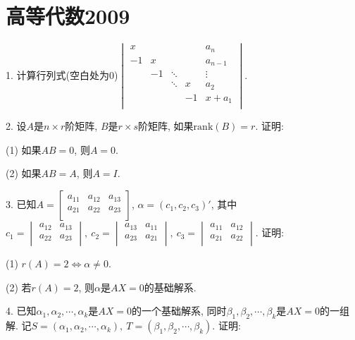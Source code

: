 \documentclass[12pt, a4paper, twoside]{ctexart}%
\begin{document}
	\section{高等代数2009}
{	\linespread{1.4}\selectfont%
	1. 计算行列式(空白处为0)$\begin{vmatrix}
		x & & & & a_n\\
		-1&x & & &a_{n-1}\\
		  &-1&\ddots& &\vdots\\
		  & &\ddots&x&a_2\\
		  & & &-1&x+a_1\\
	\end{vmatrix}$.\par 
	2. 设$A$是$n\times r$阶矩阵, $B$是$r\times s$阶矩阵, 如果$\mathrm{rank}(B)=r$. 证明: \par
	\hspace{1.2em}(1) 如果$AB=0$, 则$A=0$.\par
	\hspace{1.2em}(2) 如果$AB=A$, 则$A=I$.\par
	3. 已知$A=\begin{bmatrix}
		a_{11}&a_{12}&a_{13}\\
		a_{21}&a_{22}&a_{23}\\
	\end{bmatrix}$, $\alpha=(c_1,c_2,c_3)'$, 其中$c_1=\begin{vmatrix}
	a_{12}&a_{13}\\
	a_{22}&a_{23}\\
	\end{vmatrix},\ c_2=\begin{vmatrix}
	a_{13}&a_{11}\\
	a_{23}&a_{21}\\
	\end{vmatrix},\ c_3=\begin{vmatrix}
	a_{11}&a_{12}\\
	a_{21}&a_{22}\\
	\end{vmatrix}$. 证明: \par 
	\hspace{1.2em}(1) $r(A)=2\iff\alpha\neq0.$\par
	\hspace{1.2em}(2) 若$r(A)=2$, 则$\alpha$是$AX=0$的基础解系.\par 
	4. 已知$\alpha_1,\alpha_2,\cdots,\alpha_k$是$AX=0$的一个基础解系, 同时$\beta_1,\beta_2,\cdots,\beta_k$是$AX=0$的一组解. 记$S=(\alpha_1,\alpha_2,\cdots,\alpha_k),\ T=(\beta_1,\beta_2,\cdots,\beta_k)$. 证明: \par 
}
\end{document}
